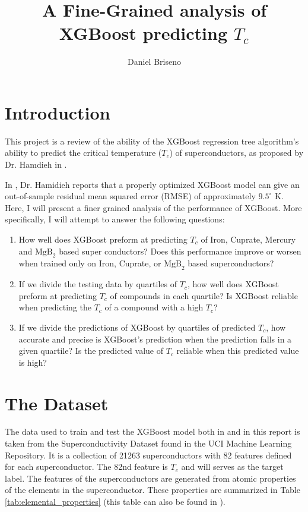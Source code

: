 \documentclass[oneside,12pt]{amsart}
\title{A Fine-Grained analysis of XGBoost predicting $T_c$ }
\author{Daniel Briseno}
\date{}
\begin{document}
\maketitle
\section{Introduction}
This project is a review of the ability of the XGBoost regression tree algorithm's ability to predict the critical temperature ($T_c$) of superconductors, as proposed by Dr. Hamdieh in \cite{hamidieh_data-driven_2018}.

In \cite{hamidieh_data-driven_2018}, Dr. Hamidieh reports that a properly optimized XGBoost model can give an out-of-sample residual mean squared error (RMSE) of approximately $9.5^\circ$ K. Here, I will present a finer grained analysis of the performance of XGBoost. More specifically, I will attempt to answer the following questions:
\begin{enumerate}
	 \item How well does XGBoost preform at predicting $T_c$ of Iron, Cuprate, Mercury and $\text{MgB}_2$ based super conductors? Does this performance improve or worsen when trained only on Iron, Cuprate, or $\text{MgB}_2$ based superconductors?
     \item If we divide the testing data by quartiles of $T_c$, how well does XGBoost preform at predicting $T_c$ of compounds in each quartile? Is XGBoost reliable when predicting the $T_c$ of a compound with a high $T_c$?
     \item If we divide the predictions of XGBoost by quartiles of predicted $T_c$, how accurate and precise is XGBoost's prediction when the prediction falls in a given quartile? Is the predicted value of $T_c$ reliable when this predicted value is high?
\end{enumerate}

\section{The Dataset}

The data used to train and test the XGBoost model both in \cite{hamidieh_data-driven_2018} and in this report is taken from the Superconductivity Dataset found in the UCI Machine Learning Repository\cite{noauthor_superconductivity_2018}. It is a collection of 21263 superconductors with 82 features defined for each superconductor. The 82nd feature is $T_c$ and will serves as the target label. The features of the superconductors are generated from atomic properties of the elements in the superconductor. These properties are summarized in Table \ref{tab:elemental_properties} (this table can also be found in \cite{hamidieh_data-driven_2018}).
\end{document}
